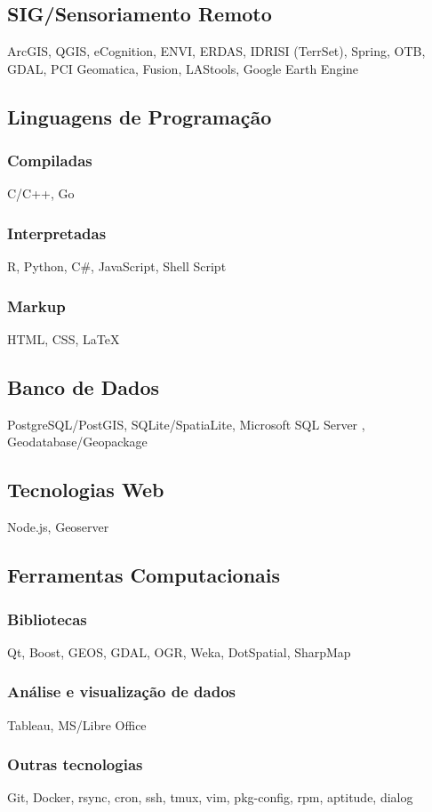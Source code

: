 \documentclass{article}
\begin{document}
\subsection{SIG/Sensoriamento Remoto}
ArcGIS, QGIS, eCognition, ENVI, ERDAS, IDRISI (TerrSet), Spring, OTB, GDAL, PCI Geomatica, Fusion, LAStools, Google Earth Engine
\subsection{Linguagens de Programação}
\subsubsection{Compiladas}
C/C++, Go
\subsubsection{Interpretadas}
R, Python, C\#, JavaScript, Shell Script
\subsubsection{Markup}
HTML, CSS, {\LaTeX}
\subsection{Banco de Dados}
PostgreSQL/PostGIS, SQLite/SpatiaLite, Microsoft SQL Server , Geodatabase/Geopackage
\subsection{Tecnologias Web}
Node.js, Geoserver
\subsection{Ferramentas Computacionais}
\subsubsection{Bibliotecas}
Qt, Boost, GEOS, GDAL, OGR, Weka, DotSpatial, SharpMap
\subsubsection{Análise e visualização de dados} 
Tableau, MS/Libre Office
\subsubsection{Outras tecnologias}
Git, Docker, rsync, cron, ssh, tmux, vim, pkg-config, rpm, aptitude, dialog 
\end{document}
